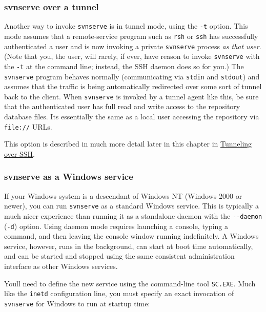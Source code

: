 \subsubsection{svnserve over a
tunnel}\label{svn.serverconfig.svnserve.invoking.tunnel}

Another way to invoke \texttt{svnserve} is in tunnel mode, using the
\texttt{-t} option. This mode assumes that a remote-service program such
as \texttt{rsh} or \texttt{ssh} has successfully authenticated a user
and is now invoking a private \texttt{svnserve} process \emph{as that
user}. (Note that you, the user, will rarely, if ever, have reason to
invoke \texttt{svnserve} with the \texttt{-t} at the command line;
instead, the SSH daemon does so for you.) The \texttt{svnserve} program
behaves normally (communicating via \texttt{stdin} and \texttt{stdout})
and assumes that the traffic is being automatically redirected over some
sort of tunnel back to the client. When \texttt{svnserve} is invoked by
a tunnel agent like this, be sure that the authenticated user has full
read and write access to the repository database files.
It\textquotesingle s essentially the same as a local user accessing the
repository via \texttt{file://} URLs.

This option is described in much more detail later in this chapter in
\hyperref[svn.serverconfig.svnserve.sshauth]{Tunneling over SSH}.

\subsubsection{svnserve as a Windows
service}\label{svn.serverconfig.svnserve.invoking.winservice}

If your Windows system is a descendant of Windows NT (Windows 2000 or
newer), you can run \texttt{svnserve} as a standard Windows service.
This is typically a much nicer experience than running it as a
standalone daemon with the \texttt{-\/-daemon} (\texttt{-d}) option.
Using daemon mode requires launching a console, typing a command, and
then leaving the console window running indefinitely. A Windows service,
however, runs in the background, can start at boot time automatically,
and can be started and stopped using the same consistent administration
interface as other Windows services.

You\textquotesingle ll need to define the new service using the
command-line tool \texttt{SC.EXE}. Much like the \texttt{inetd}
configuration line, you must specify an exact invocation of
\texttt{svnserve} for Windows to run at startup time:

